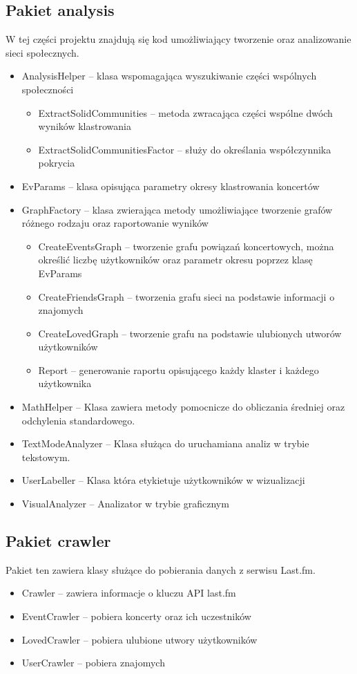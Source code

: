 \documentclass[10pt,a4paper]{article}
\begin{document}
\subsection{Pakiet analysis}
W tej części projektu znajdują się kod umożliwiający tworzenie oraz analizowanie sieci społecznych.
\begin{itemize}
\item AnalysisHelper – klasa wspomagająca wyszukiwanie części wspólnych społeczności
\begin{itemize}
\item ExtractSolidCommunities – metoda zwracająca części wspólne dwóch wyników klastrowania
\item ExtractSolidCommunitiesFactor – służy do określania współczynnika pokrycia
\end{itemize}
\item EvParams – klasa opisująca parametry okresy klastrowania koncertów
\item GraphFactory – klasa zwierająca metody umożliwiające tworzenie grafów różnego rodzaju oraz raportowanie wyników
\begin{itemize}
\item CreateEventsGraph – tworzenie grafu powiązań koncertowych, można określić liczbę użytkowników oraz parametr okresu poprzez klasę EvParams
\item CreateFriendsGraph – tworzenia grafu sieci na podstawie informacji o znajomych
\item CreateLovedGraph – tworzenie  grafu na podstawie ulubionych utworów użytkowników
\item Report – generowanie raportu opisującego każdy klaster i każdego użytkownika
\end{itemize}
\item MathHelper – Klasa zawiera metody pomocnicze do obliczania średniej oraz odchylenia standardowego.
\item TextModeAnalyzer – Klasa służąca do uruchamiana analiz w trybie tekstowym.
\item UserLabeller – Klasa która etykietuje użytkowników w wizualizacji
\item VisualAnalyzer – Analizator w trybie graficznym
\end{itemize}

\subsection{Pakiet crawler}
Pakiet ten zawiera klasy służące do pobierania danych z serwisu Last.fm.
\begin{itemize}
\item Crawler – zawiera informacje o kluczu API last.fm 
\item EventCrawler – pobiera koncerty oraz ich uczestników
\item LovedCrawler – pobiera ulubione utwory użytkowników
\item UserCrawler – pobiera znajomych
\end{itemize}
\end{document}
